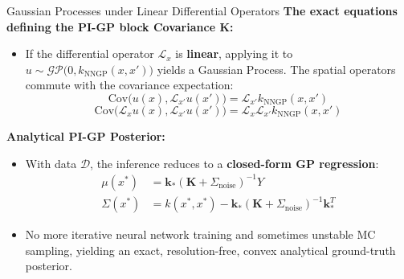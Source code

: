 \documentclass[10pt, aspectratio=169]{beamer}
\begin{document}
\begin{frame}{Gaussian Processes under Linear Differential Operators}
    \textbf{The exact equations defining the PI-GP block Covariance $\mathbf{K}$:}
    \begin{itemize}
        \item If the differential operator $\mathcal{L}_x$ is \textbf{linear}, applying it to $u \sim \mathcal{GP}\big(0, k_{\text{NNGP}}(x, x')\big)$ yields a Gaussian Process. The spatial operators commute with the covariance expectation:
        \[
        \text{Cov}\big(u(x), \mathcal{L}_{x'} u(x')\big) = \mathcal{L}_{x'} k_{\text{NNGP}}(x, x')
        \]
        \[
        \text{Cov}\big(\mathcal{L}_x u(x), \mathcal{L}_{x'} u(x')\big) = \mathcal{L}_x \mathcal{L}_{x'} k_{\text{NNGP}}(x, x')
        \]
    \end{itemize}
    \textbf{Analytical PI-GP Posterior:}
    \begin{itemize}
        \item With data $\mathcal{D}$, the inference reduces to a \textbf{closed-form GP regression}:
        \begin{align*}
        \mu(x^*) &= \mathbf{k}_{*} (\mathbf{K} + \Sigma_{\text{noise}})^{-1} Y \\
        \Sigma(x^*) &= k(x^*, x^*) - \mathbf{k}_{*} (\mathbf{K} + \Sigma_{\text{noise}})^{-1} \mathbf{k}_{*}^T
        \end{align*}
        \item No more iterative neural network training and sometimes unstable MC sampling, yielding an exact, resolution-free, convex analytical ground-truth posterior.
    \end{itemize}
\end{frame}
\end{document}

